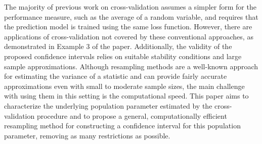 \documentclass[12pt]{article}
\begin{document}
The majority of previous work on cross-validation assumes a simpler form for the performance measure, such as the average of a random variable, and requires that the prediction model is trained using the same loss function. However, there are applications of cross-validation not covered by these conventional approaches, as demonstrated in Example 3 of the paper. Additionally, the validity of the proposed confidence intervals relies on suitable stability conditions and large sample approximations. Although resampling methods are a well-known approach for estimating the variance of a statistic and can provide fairly accurate approximations even with small to moderate sample sizes, the main challenge with using them in this setting is the computational speed. This paper aims to characterize the underlying population parameter estimated by the cross-validation procedure and to propose a general, computationally efficient resampling method for constructing a confidence interval for this population parameter, removing as many restrictions as possible.
\end{document}
